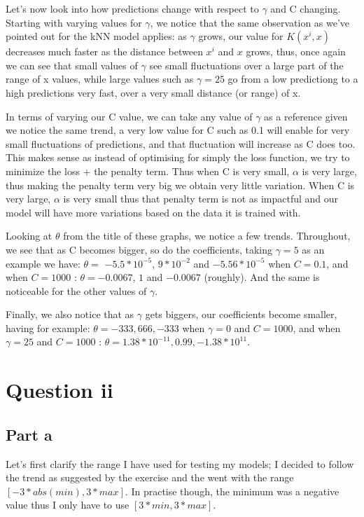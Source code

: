 \documentclass[10pt]{article}
\begin{document}
Let's now look into how predictions change with respect to $\gamma$ and C changing. Starting with varying values for
$\gamma$, we notice that the same observation as we've pointed out for the kNN model applies: as $\gamma$ grows, our 
value for $K(x^{i}, x)$ decreases much faster as the distance between $x^{i}$ and $x$ grows, thus, once again we can see
that small values of $\gamma$ see small fluctuations over a large part of the range of x values, while large values such 
as $\gamma = 25$ go from a low predictiong to a high predictions very fast, over a very small distance (or range) of x.

\vspace{5mm} %

In terms of varying our C value, we can take any value of $\gamma$ as a reference given we notice the same trend,
a very low value for C such as 0.1 will enable for very small fluctuations of predictions, and that fluctuation will
increase as C does too. This makes sense as instead of optimising for simply the loss function, we try to minimize the
loss + the penalty term. Thus when C is very small, $\alpha$ is very large, thus making the penalty term very big we
obtain very little variation. When C is very large, $\alpha$ is very small thus that penalty term is not as impactful
and our model will have more variations based on the data it is trained with.

\vspace{5mm} %

Looking at $\theta$ from the title of these graphs, we notice a few trends. Throughout, we see that as C becomes bigger,
so do the coefficients, taking $\gamma = 5$ as an example we have: $\theta = $ $-5.5 * 10^{-5}$, $9*10^{-2}$ and $-5.56*10^{-5}$ 
when $C = 0.1$, and when $ C = 1000$ : $\theta = - 0.0067$, $1$ and $-0.0067$ (roughly). And the same is noticeable for the other
values of $\gamma$.

Finally, we also notice that as $\gamma$ gets biggers, our coefficients become smaller, having for example:
$\theta = -333, 666, -333$ when $\gamma = 0$ and $C = 1000$, and when $\gamma = 25$ and $C = 1000$ : 
$\theta = 1.38 * 10^{-11}, 0.99, -1.38 * 10^{11}$.


\section{Question ii}
\subsection*{Part a}
Let's first clarify the range I have used for testing my models; I decided to follow the trend as suggested 
by the exercise and the went with the range $[- 3 * abs(min), 3 * max]$. In practise though,
the minimum was a negative value thus I only have to use $[3 * min, 3 * max]$.  
\end{document}
